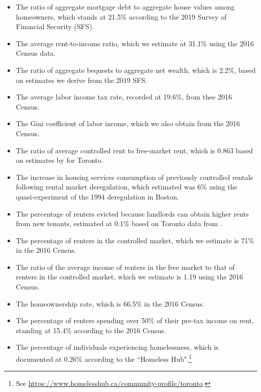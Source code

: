 \documentclass[parskip=full]{article}
\begin{document}
\begin{itemize}
    \item The ratio of aggregate mortgage debt to aggregate house values among homeowners, which stands at 21.5\% according to the 2019 Survey of Financial Security (SFS).
    \item The average rent-to-income ratio, which we estimate at 31.1\% using the 2016 Census data.
    \item The ratio of aggregate bequests to aggregate net wealth, which is 2.2\%, based on estimates we derive from the 2019 SFS.
    \item The average labor income tax rate, recorded at 19.6\%, from thee 2016 Census.
    \item The Gini coefficient of labor income, which we also obtain from the 2016 Census.
    \item The ratio of average controlled rent to free-market rent, which is 0.863 based on estimates by \citet{zhang-gou} for Toronto.
    \item The increase in housing services consumption of previously controlled rentals following rental market deregulation, which \citet{sims-2007} estimated was 6\% using the quasi-experiment of the 1994 deregulation in Boston.
    \item The percentage of renters evicted because landlords can obtain higher rents from new tenants, estimated at 0.1\% based on Toronto data from \citet{LeonIveniuk2020}.
    \item The percentage of renters in the controlled market, which we estimate is 71\% in the 2016 Census.
    \item The ratio of the average income of renters in the free market to that of renters in the controlled market, which we estimate is 1.19 using the 2016 Census. 
    \item The homeownership rate, which is 66.5\% in the 2016 Census.
    \item The percentage of renters spending over 50\% of their pre-tax income on rent, standing at 15.4\% according to the 2016 Census.
    \item The percentage of individuals experiencing homelessness, which is documented at 0.26\% according to the ``Homeless Hub".\footnote{See \url{https://www.homelesshub.ca/community-profile/toronto}.}
\end{itemize}
\end{document}

